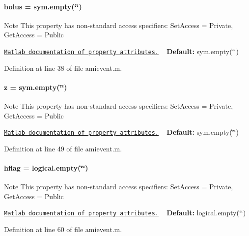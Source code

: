 \paragraph[{bolus}]{\setlength{\rightskip}{0pt plus 5cm}bolus = sym.\+empty(\char`\"{}\char`\"{})}\label{classamievent_ab9227561ac246ee4b70f9e65c25ffda7}
\begin{DoxyNote}{Note}
This property has non-\/standard access specifiers\+: {\ttfamily Set\+Access = Private, Get\+Access = Public} 

\href{http://www.mathworks.com/help/matlab/matlab_oop/property-attributes.html}{\tt Matlab documentation of property attributes.} ~\newline
{\bfseries Default\+:} sym.\+empty(\char`\"{}\char`\"{}) 
\end{DoxyNote}


Definition at line 38 of file amievent.\+m.

\hypertarget{classamievent_a25ed1bcb423b0b7200f485fc5ff71c8e}{}
\paragraph[{z}]{\setlength{\rightskip}{0pt plus 5cm}z = sym.\+empty(\char`\"{}\char`\"{})}\label{classamievent_a25ed1bcb423b0b7200f485fc5ff71c8e}
\begin{DoxyNote}{Note}
This property has non-\/standard access specifiers\+: {\ttfamily Set\+Access = Private, Get\+Access = Public} 

\href{http://www.mathworks.com/help/matlab/matlab_oop/property-attributes.html}{\tt Matlab documentation of property attributes.} ~\newline
{\bfseries Default\+:} sym.\+empty(\char`\"{}\char`\"{}) 
\end{DoxyNote}


Definition at line 49 of file amievent.\+m.

\hypertarget{classamievent_ab98347b5ce6fbe7bd007030346b88575}{}
\paragraph[{hflag}]{\setlength{\rightskip}{0pt plus 5cm}hflag = logical.\+empty(\char`\"{}\char`\"{})}\label{classamievent_ab98347b5ce6fbe7bd007030346b88575}
\begin{DoxyNote}{Note}
This property has non-\/standard access specifiers\+: {\ttfamily Set\+Access = Private, Get\+Access = Public} 

\href{http://www.mathworks.com/help/matlab/matlab_oop/property-attributes.html}{\tt Matlab documentation of property attributes.} ~\newline
{\bfseries Default\+:} logical.\+empty(\char`\"{}\char`\"{}) 
\end{DoxyNote}


Definition at line 60 of file amievent.\+m.

